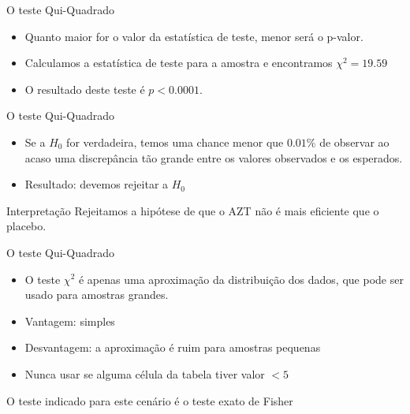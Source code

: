 \documentclass{beamer}
\begin{document}
\begin{frame}{O teste Qui-Quadrado}
  \begin{itemize}
    \small
  \item Quanto \alert{maior} for o valor da estatística de teste,
    \alert{menor} será o p-valor.
  \item Calculamos a estatística de teste para a amostra e encontramos
    $\chi^2 = 19.59$
  \item O resultado deste teste é $p<0.0001$.
  \end{itemize}
\end{frame}

\begin{frame}{O teste Qui-Quadrado}
  \begin{itemize}
    \small
  \item Se a $H_0$ for verdadeira, temos uma chance menor que $0.01\%$
    de observar ao acaso uma discrepância tão grande entre os valores
    observados e os esperados.
  \item Resultado: devemos \alert{rejeitar} a $H_0$
  \end{itemize}
  \begin{block}{Interpretação}
    Rejeitamos a hipótese de que o AZT não é mais eficiente que o
    placebo.
  \end{block}
\end{frame}

\begin{frame}{O teste Qui-Quadrado}
  \begin{itemize}
    \small
  \item O teste $\chi^2$ é apenas uma aproximação da distribuição dos
    dados, que pode ser usado para amostras grandes.
  \item Vantagem: simples
  \item Desvantagem: a aproximação é ruim para amostras pequenas
  \item Nunca usar se alguma célula da tabela tiver valor \alert{$<5$}
    \bigskip
  \end{itemize}
  \begin{block}{}
    O teste indicado para este cenário é o \alert{teste exato de Fisher}
  \end{block}
\end{frame}
\end{document}
